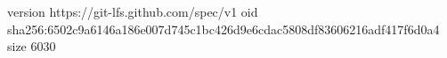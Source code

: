 version https://git-lfs.github.com/spec/v1
oid sha256:6502c9a6146a186e007d745c1bc426d9e6cdac5808df83606216adf417f6d0a4
size 6030
